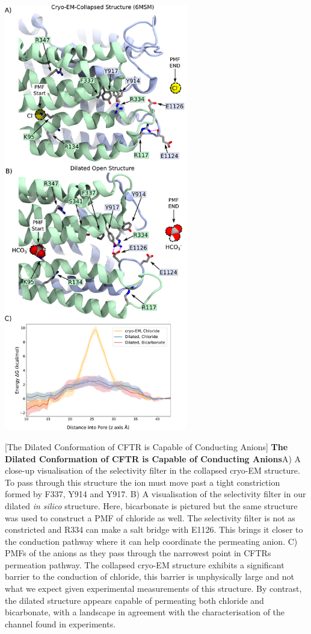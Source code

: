 	\begin{center}
		\includegraphics[width=0.6\textwidth]{figures/opening/pmf_fig_1_combined.pdf}
	\end{center}
\begingroup

	\captionsetup{singlelinecheck = false, justification=raggedright}
	[The Dilated Conformation of CFTR is Capable of Conducting Anions] {\textbf{The Dilated Conformation of CFTR is Capable of Conducting Anions}}{A) A close-up visualisation of the selectivity filter in the collapsed cryo-EM structure. To pass through this structure the ion must move past a tight constriction formed by F337, Y914 and Y917. B) A visualisation of the selectivity filter in our dilated \textit{in silico} structure. Here, bicarbonate is pictured but the same structure was used to construct a PMF of chloride as well. The selectivity filter is not as constricted and R334 can make a salt bridge with E1126. This brings it closer to the conduction pathway where it can help coordinate the permeating anion. C) PMFs of the anions as they pass through the narrowest point in CFTRs permeation pathway. The collapsed cryo-EM structure exhibits a significant barrier to the conduction of chloride, this barrier is unphysically large and not what we expect given experimental measurements of this structure. By contrast, the dilated structure appears capable of permeating both chloride and bicarbonate, with a landscape in agreement with the characterisation of the channel found in experiments. }
	\label{US_anions}
	\endgroup



